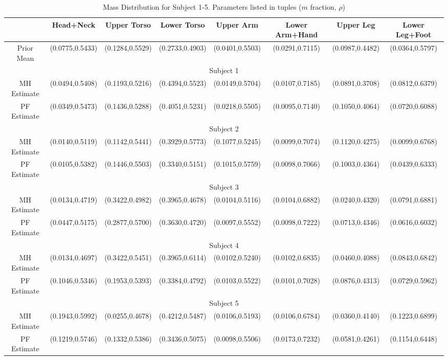 \begin{table}[t]
\caption{Mass Distribution for Subject 1-5. Parameters listed in tuples ($m$ fraction, $\rho$)}
\label{table:massdist}
\begin{center}
\begin{tabular}{|c|c|c|c|c|c|c|c|}
\hline
 &Head+Neck & Upper Torso & Lower Torso & Upper Arm & Lower Arm+Hand & Upper Leg & Lower Leg+Foot\\
\hline
\hline
 Prior Mean &(0.0775,0.5433) & (0.1284,0.5529) & (0.2733,0.4903) & (0.0401,0.5503) & (0.0291,0.7115) & (0.0987,0.4482) & (0.0364,0.5797) \\
\hline
  \multicolumn{8}{|c|}{Subject 1} \\
\hline
 MH Estimate &(0.0494,0.5408) & (0.1193,0.5216) & (0.4394,0.5523) & (0.0149,0.5704) & (0.0107,0.7185) & (0.0891,0.3708) & (0.0812,0.6379) \\
\hline
 PF Estimate & (0.0349,0.5473) & (0.1436,0.5288) & (0.4051,0.5231) & (0.0218,0.5505) & (0.0095,0.7140) &  (0.1050,0.4064) & (0.0720,0.6088) \\
\hline
  \multicolumn{8}{|c|}{Subject 2} \\
\hline
 MH Estimate & (0.0140,0.5119) & (0.1142,0.5441) & (0.3929,0.5773) & (0.1077,0.5245) & (0.0099,0.7074) & (0.1120,0.4275) & (0.0099,0.6768) \\
\hline
 PF Estimate & (0.0105,0.5382) & (0.1446,0.5503) & (0.3340,0.5151) & (0.1015,0.5759) & (0.0098,0.7066) & (0.1003,0.4364) & (0.0439,0.6333) \\
\hline
  \multicolumn{8}{|c|}{Subject 3} \\
\hline
 MH Estimate & (0.0134,0.4719) & (0.3422,0.4982) & (0.3965,0.4678) & (0.0104,0.5116) & (0.0104,0.6882) & (0.0240,0.4320) & (0.0791,0.6881) \\
\hline
 PF Estimate & (0.0447,0.5175) & (0.2877,0.5700) & (0.3630,0.4720) & (0.0097,0.5552) & (0.0098,0.7222) & (0.0713,0.4346) & (0.0616,0.6032) \\
\hline
  \multicolumn{8}{|c|}{Subject 4} \\
\hline
 MH Estimate & (0.0134,0.4697) & (0.3422,0.5451) & (0.3965,0.6114) & (0.0102,0.5240) & (0.0102,0.6835) & (0.0460,0.4088) & (0.0843,0.6842) \\
\hline
 PF Estimate & (0.1046,0.5346) & (0.1953,0.5393) & (0.3384,0.4792) & (0.0103,0.5522) & (0.0101,0.7028) & (0.0876,0.4313) & (0.0729,0.5962) \\
\hline
  \multicolumn{8}{|c|}{Subject 5} \\
\hline
 MH Estimate & (0.1943,0.5992) & (0.0255,0.4678) & (0.4212,0.5487) & (0.0106,0.5193) & (0.0106,0.6784) & (0.0360,0.4140) & (0.1223,0.6899) \\
\hline
 PF Estimate & (0.1219,0.5746) & (0.1332,0.5386) & (0.3436,0.5075) & (0.0098,0.5506) & (0.0173,0.7232) & (0.0581,0.4261) & (0.1154,0.6448) \\
\hline
\end{tabular}
\end{center}
\end{table}
